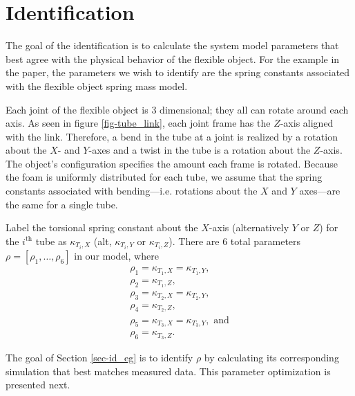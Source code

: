 \documentclass[runningheads,a4paper]{llncs}
\begin{document}
\section{Identification}
\label{sec-id}
The goal of the identification is to calculate the system model parameters that best agree with the physical behavior of the flexible object. For the example in the paper, the parameters we wish to identify are the spring constants associated with the flexible object spring mass model. 

Each joint of the flexible object is 3 dimensional; they all can rotate around each axis. As seen in figure \ref{fig-tube_link}, each joint frame has the $Z$-axis aligned with the link. Therefore, a bend in the tube at a joint is realized by a rotation about the $X$- and $Y$-axes and a twist in the tube is a rotation about the $Z$-axis. The object's configuration specifies the amount each frame is rotated. Because the foam is uniformly distributed for each tube, we assume that the spring constants associated with bending---i.e. rotations about the $X$ and $Y$ axes---are the same for a single tube. 


Label the torsional spring constant about the $X$-axis (alternatively $Y$ or $Z$) for the $i^{\textrm{th}}$ tube as $\kappa_{T_i,X}$ (alt, $\kappa_{T_i,Y}$ or $\kappa_{T_i,Z}$). There are 6 total parameters $\rho = [\rho_1,\ldots,\rho_6]$ in our model, where 
\begin{equation}
\begin{array}{l}
\rho_1 = \kappa_{T_1,X} = \kappa_{T_1,Y}, \\
\rho_2 = \kappa_{T_1,Z}, \\
\rho_3 = \kappa_{T_2,X} = \kappa_{T_2,Y}, \\
\rho_4 = \kappa_{T_2,Z} , \\
\rho_5 = \kappa_{T_3,X} = \kappa_{T_3,Y}, \textrm{ and} \\
\rho_6 = \kappa_{T_3,Z}. 
\end{array}
\label{eq-params}
\end{equation}

The goal of Section \ref{sec-id_eg} is to identify $\rho$ by calculating its corresponding simulation that best matches measured data.  This parameter optimization is presented next.%
\end{document}
